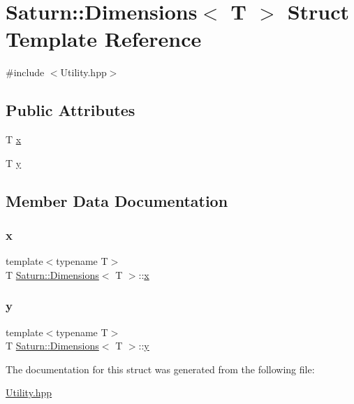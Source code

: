 \hypertarget{struct_saturn_1_1_dimensions}{}\section{Saturn\+:\+:Dimensions$<$ T $>$ Struct Template Reference}
\label{struct_saturn_1_1_dimensions}


{\ttfamily \#include $<$Utility.\+hpp$>$}

\subsection*{Public Attributes}
\begin{DoxyCompactItemize}
\item 
T \mbox{\hyperlink{struct_saturn_1_1_dimensions_a9f00a8c78c1784e1c0ef735729a9e28b}{x}}
\item 
T \mbox{\hyperlink{struct_saturn_1_1_dimensions_a2a2383a1d2e5645f38187cba8cf549a3}{y}}
\end{DoxyCompactItemize}


\subsection{Member Data Documentation}
\mbox{\label{struct_saturn_1_1_dimensions_a9f00a8c78c1784e1c0ef735729a9e28b}} 
\subsubsection{\texorpdfstring{x}{x}}
{\footnotesize\ttfamily template$<$typename T$>$ \\
T \mbox{\hyperlink{struct_saturn_1_1_dimensions}{Saturn\+::\+Dimensions}}$<$ T $>$\+::\mbox{\hyperlink{glad_8h_a3dddca64560508b8d5bd9ee938e2d3a3}{x}}}

\mbox{\label{struct_saturn_1_1_dimensions_a2a2383a1d2e5645f38187cba8cf549a3}} 
\subsubsection{\texorpdfstring{y}{y}}
{\footnotesize\ttfamily template$<$typename T$>$ \\
T \mbox{\hyperlink{struct_saturn_1_1_dimensions}{Saturn\+::\+Dimensions}}$<$ T $>$\+::\mbox{\hyperlink{glad_8h_a12b33d8afd2f771e63a85ea45a440c64}{y}}}



The documentation for this struct was generated from the following file\+:\begin{DoxyCompactItemize}
\item 
\mbox{\hyperlink{_utility_8hpp}{Utility.\+hpp}}\end{DoxyCompactItemize}

